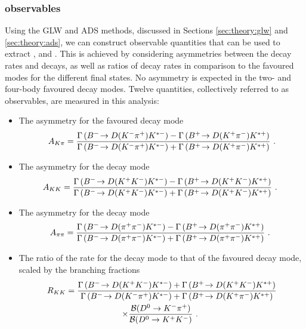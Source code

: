 \subsubsection{\CP observables}
\label{sec:theory:observables}

Using the GLW and ADS methods, discussed in Sections \ref{sec:theory:glw} and \ref{sec:theory:ads}, we can construct observable quantities that can be used to extract \rb, \deltab and \Pgamma. This is achieved by considering asymmetries between the decay rates \Bm and \Bp decays, as well as ratios of decay rates in comparison to the favoured modes for the different \D final states. No \CP asymmetry is expected in the two- and four-body favoured \D decay modes. Twelve quantities, collectively referred to as \CP observables, are measured in this analysis:

\begin{itemize}
\item{The \CP asymmetry for the favoured decay mode
\begin{equation}
A_{{K}\pi} = \frac{\Gamma\left({{{B}^-}}\!\rightarrow {\ensuremath{D}}({{K}^-}{{\pi}^+}){{K}^{*-}}\right) - \Gamma\left({{{B}^+}}\!\rightarrow {\ensuremath{D}}({{K}^+}{{\pi}^-}){{K}^{*+}}\right)}{\Gamma\left({{{B}^-}}\!\rightarrow {\ensuremath{D}}({{K}^-}{{\pi}^+}){{K}^{*-}}\right) + \Gamma\left({{{B}^+}}\!\rightarrow {\ensuremath{D}}({{K}^+}{{\pi}^-}){{K}^{*+}}\right)} \text{ .}
\label{eqn:Akpi}
\end{equation}}
\item{The \CP asymmetry for the \decay{\D}{\Kp\Km} decay mode
\begin{equation}
A_{{K}{K}} = \frac{\Gamma\left({{{B}^-}}\!\rightarrow {\ensuremath{D}}({{K}^+}{{K}^-}){{K}^{*-}}\right) - \Gamma\left({{{B}^+}}\!\rightarrow {\ensuremath{D}}({{K}^+}{{K}^-}){{K}^{*+}}\right)}{\Gamma\left({{{B}^-}}\!\rightarrow {\ensuremath{D}}({{K}^+}{{K}^-}){{K}^{*-}}\right) + \Gamma\left({{{B}^+}}\!\rightarrow {\ensuremath{D}}({{K}^+}{{K}^-}){{K}^{*+}}\right)} \text{ . }
\label{eqn:Akk}
\end{equation}
}
\item{The \CP asymmetry for the \decay{\D}{\pip\pim} decay mode
\begin{equation}
A_{\pi\pi} = \frac{\Gamma\left({{{B}^-}}\!\rightarrow {\ensuremath{D}}({{\pi}^+}{{\pi}^-}){{K}^{*-}}\right) - \Gamma\left({{{B}^+}}\!\rightarrow {\ensuremath{D}}({{\pi}^+}{{\pi}^-}){{K}^{*+}}\right)}{\Gamma\left({{{B}^-}}\!\rightarrow {\ensuremath{D}}({{\pi}^+}{{\pi}^-}){{K}^{*-}}\right) + \Gamma\left({{{B}^+}}\!\rightarrow {\ensuremath{D}}({{\pi}^+}{{\pi}^-}){{K}^{*+}}\right)} \text{ . }
\label{eqn:Apipi}
\end{equation}}
\item{The ratio of the rate for the \decay{\D}{\Kp\Km} decay mode to that of the favoured decay mode, scaled by the branching fractions
\begin{multline}
R_{\kaon\kaon} = \frac{\Gamma\left(\decay{\Bm}{\D(\Kp\Km)\Kstarm}\right) + \Gamma\left(\decay{\Bp}{\D(\Kp\Km)\Kstarp}\right)}{\Gamma\left(\decay{\Bm}{\D(\Km\pip)\Kstarm}\right) + \Gamma\left(\decay{\Bp}{\D(\Kp\pim)\Kstarp}\right)} \\ \times \frac{\BR(D^0 \to K^-\pi^+)}{\BR(D^0 \to K^+K^-)} \text{ . }

\end{multline}}
\end{itemize}
